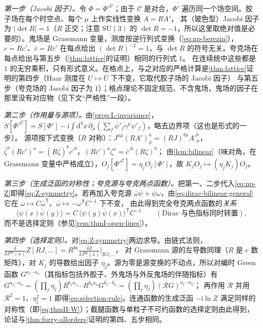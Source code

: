 \documentclass[UTF8,a4paper,11pt,fontset=fandol]{ctexart}
\makeatletter
\theoremstyle{cplain}
\theoremstyle{cdefinition}
\theoremstyle{cremark}
\renewcommand{\proofname}{证明}
\renewenvironment{proof}[1][\proofname]{\par\pushQED{\qed}\normalfont\topsep6\p@\@plus6\p@\relax
  \trivlist\item[\hskip\labelsep\itshape #1\hspace{0.5em}]\ignorespaces}{\popQED\endtrivlist\@endpefalse}
\numberwithin{equation}{section}
\newcommand{\dd}{\mathrm{d}}                         %
\newcommand{\tp}{\mathsf{T}}                         %
\newcommand{\Cop}{\mathcal{C}}                       %
\newcommand{\Rop}{\mathcal{R}}                       %
\newcommand{\ii}{\mathrm{i}}                        %
\makeatother
\begin{document}
\begin{proof}[推导]
\emph{第一步（Jacobi 因子）。}令 $\Phi=\Phi'^{\Cop}$；由于 $\Cop$ 是对合，$\Phi'$ 遍历同一个场空间。胶子场在每个时空点、每个 $\mu$ 上作实线性变换 $A=RA'$，
其（玻色型）Jacobi 因子为 $|\det R|=1$（$R$ 正交；注意 $\mathrm{SU}(3)$ 的 $\det R=-1$，所以这里取绝对值是必要的）。鬼场是 Grassmann 变量，测度按逆行列式变换（\cref{eq:np-berezin}），
$c=Rc'$、$\bar c=R\bar c'$ 在每点给出 $(\det R)^{-2}=1$，与 $\det R$ 的符号无关。夸克场在每点给出与第五步（\cref{thm:lattice}的证明）相同的行列式 $1$。
在连续统中这些都是 $1$ 的无穷乘积，只有形式意义。在格点上，与之对应的严格计算是\cref{thm:lattice}证明的第四步（Haar 测度在 $U\mapsto\overline U$ 下不变，它取代胶子场的 Jacobi 因子）
与第五步（夸克场的 Jacobi 因子为 $1$）；格点理论不固定规范、不含鬼场，鬼场的因子在那里没有对应物（见下文“严格性”一段）。

\emph{第二步（作用量与源项）。}由\cref{prop:L-invariance}，$S[\Phi'^{\Cop}]=S[\Phi']-\ii\int\dd^4x\,\partial_\mu(\sum_f\bar\psi'_f\gamma^\mu\psi'_f)$，略去边界项（这也是形式的一步）。
源项按下式变换（$R$ 对称）：$J^{a\mu}(RA')^a_\mu=(RJ)^{b\mu}A'^b_\mu$，$\bar\zeta^a(Rc')^a=(R\bar\zeta)^bc'^b$，$(R\bar c')^a\zeta^a=\bar c'^b(R\zeta)^b$；
由\cref{lem:bilinear}（味对角，在 Grassmann 变量中严格成立），$O_j[\Phi'^{\Cop}]=\eta_jO_j[\Phi']$，故 $K_jO_j\mapsto(\eta_jK_j)O_j$。

\emph{第三步（生成泛函的对称性；夸克源与夸克两点函数）。}把第一、二步代入\cref{eq:np-Z}即得\cref{eq:Z-symmetry}。若再加入夸克源 $\bar\omega\psi+\bar\psi\omega$，由\cref{eq:dirac-bilinear-general}它在 $\omega\mapsto C\bar\omega^{\tp}$、$\bar\omega\mapsto-\omega^{\tp}C^{-1}$ 下不变，
由此得到完全夸克两点函数的\emph{关系}
\begin{equation*}
\langle\psi(x)\bar\psi(y)\rangle=C\,\langle\psi(y)\bar\psi(x)\rangle^{\tp}C^{-1}\qquad(\text{Dirac 与色指标同时转置}),
\end{equation*}
而不是选择定则（参见\cref{rem:thmI-open-lines}）。

\emph{第四步（选择定则）。}对\cref{eq:Z-symmetry}两边求导。由链式法则，$\frac{\delta}{\delta J^{a\mu}(x)}Z[RJ,\dots]=R^{ba}\frac{\delta Z}{\delta J^{b\mu}(x)}\Big|_{RJ,\dots}$，
对 Grassmann 源的左导数同理（$R$ 是 c 数矩阵），对 $K_j$ 的导数给出因子 $\eta_j$。源为零是源变换的不动点，所以对编时 Green 函数
$G^{a_1\cdots a_n}$（其指标包括外胶子、外鬼场与外反鬼场的伴随指标）有 $G^{a_1\cdots a_n}=(\prod_j\eta_j)R^{b_1a_1}\cdots R^{b_na_n}G^{b_1\cdots b_n}=(\prod_j\eta_j)(\Rop G)^{a_1\cdots a_n}$；
再作用 $\Rop$ 并用 $\Rop^2=1$、$\eta_j^2=1$ 即得\cref{eq:selection-rule}。连通函数的生成泛函 $-\ii\ln Z$ 满足同样的对称性（即\cref{eq:thmII-W}）；截腿函数与单粒子不可约函数的选择定则由此得到，
论证与\cref{thm:furry-allorders}证明的第四、五步相同。


\end{proof}
\end{document}
